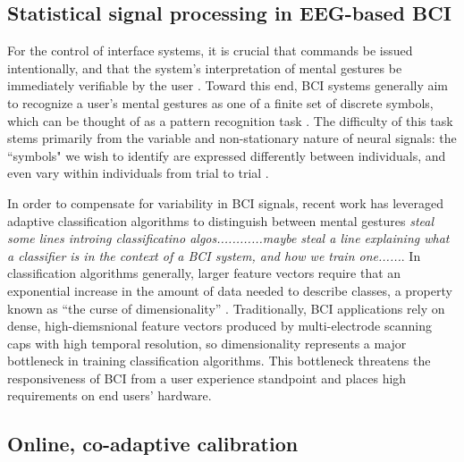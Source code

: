 \subsection{Statistical signal processing in EEG-based BCI}

For the control of interface systems, it is crucial that commands be issued intentionally, and that the system's interpretation of mental gestures be immediately verifiable by the user  \cite{millan_combining_2010,ali_empirical_2014}. Toward this end, BCI systems generally aim to recognize a user's mental gestures as one of a finite set of discrete symbols, which can be thought of as a pattern recognition task \cite{lotte_review_2007}. The difficulty of this task stems primarily from the variable and non-stationary nature of neural signals: the ``symbols" we wish to identify are expressed differently between individuals, and even vary within individuals from trial to trial \cite{vidaurre_fully_2006,vidaurre_machine-learning-based_2011}. 

In order to compensate for variability in BCI signals, recent work has leveraged adaptive classification algorithms to distinguish between mental gestures \cite{lotte_review_2007,vidaurre_machine-learning-based_2011} \textit{steal some lines introing classificatino algos............maybe steal a line explaining what a classifier is in the context of a BCI system, and how we train one......}.  In classification algorithms generally, larger feature vectors require that an exponential increase in the amount of data needed to describe classes, a property known as ``the curse of dimensionality'' \cite{jain_statistical_2000,raudys_small_1991}. Traditionally, BCI applications rely on dense, high-diemsnional feature vectors produced by multi-electrode scanning caps with high temporal resolution, so dimensionality represents a major bottleneck in training classification algorithms. This bottleneck threatens the responsiveness of BCI from a user experience standpoint and places high requirements on end users' hardware.

\subsection{Online, co-adaptive calibration}

